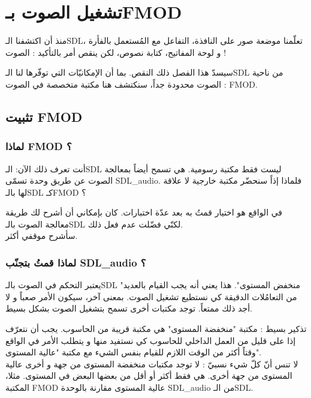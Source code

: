 \chapter{تشغيل الصوت بـ\textenglish{FMOD}}

منذ أن اكتشفنا الـ\textenglish{SDL}،
تعلّمنا موضعة صور على النافذة، التفاعل مع المُستعمل بالفأرة و لوحة المفاتيح، كتابة نصوص، لكن ينقص أمر بالتأكيد : الصوت !

سيسدّ هذا الفصل ذلك النقص. بما أن الإمكانيّات التي توفّرها لنا الـ\textenglish{SDL}
من ناحية الصوت محدودة جداً، سنكتشف هنا مكتبة متخصصة في الصوت :
\textenglish{FMOD}.

\section{تثبيت \textenglish{FMOD}}

\subsection{لماذا \textenglish{FMOD} ؟}

أنت تعرف ذلك الآن: الـ\textenglish{SDL}
ليست فقط مكتبة رسومية. هي تسمح أيضاً بمعالجة الصوت عن طريق وحدة تسمّى
\textenglish{SDL\_audio}.
فلماذا إذاً سنحضّر مكتبة خارجية لا علاقة لها بالـ\textenglish{SDL}
كـ\textenglish{FMOD} ؟

في الواقع هو اختيار قمتُ به بعد عدّة اختبارات. كان بإمكاني أن أشرح لك طريقة معالجة الصوت بالـ\textenglish{SDL}
لكنّي فضّلت عدم فعل ذلك.\\
سأشرح موقفي أكثر.

\subsection{لماذا قمتُ بتجنّب \textenglish{SDL\_audio} ؟}

يعتبر التحكم في الصوت بالـ\textenglish{SDL}
"منخفض المستوى". هذا يعني أنه يجب القيام بالعديد من التعامُلات الدقيقة كي نستطيع تشغيل الصوت. بمعنى آخر، سيكون الأمر صعباً و لا أجد ذلك ممتعاً. توجد مكتبات أخرى تسمح بتشغيل الصوت بشكل بسيط.

\begin{information}
تذكير بسيط : مكتبة "منخفضة المستوى" هي مكتبة قريبة من الحاسوب. يجب أن نتعرّف إذا على قليل من العمل الداخلي للحاسوب كي نستفيد منها و يتطلب الأمر في الواقع وقتاً أكثر من الوقت اللازم للقيام بنفس الشيء مع مكتبة "عالية المستوى".\\
لا تنس أنّ كلّ شيء نسبيّ : لا توجد مكتبات منخفضة المستوى من جهة و أخرى عالية المستوى من جهة أخرى. هي فقط أكثر أو أقل من بعضها البعض في المستوى. مثلا، المكتبة
\textenglish{FMOD}
عالية المستوى مقارنة بالوحدة
\textenglish{SDL\_audio}
من الـ\textenglish{SDL}.
\end{information}


